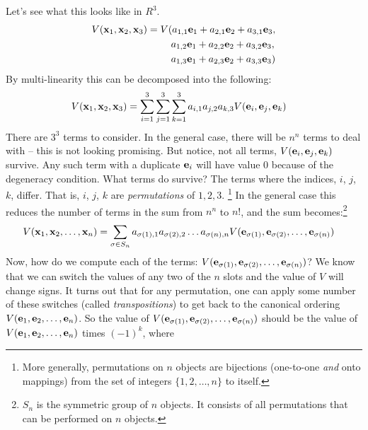 \documentclass{article}
\begin{document}
Let's see what this looks like in $R^3$.
\begin{align}
  V({\bf x}_1, {\bf x}_2, {\bf x}_3)
  &= V(a_{1,1} {\bf e}_1 + a_{2,1} {\bf e}_2 + a_{3,1} {\bf e}_3, \nonumber \\
  &\phantom{= V(\,}a_{1,2} {\bf e}_1 + a_{2,2} {\bf e}_2 + a_{3,2} {\bf e}_3, \nonumber \\
  &\phantom{= V(\,}a_{1,3} {\bf e}_1 + a_{2,3} {\bf e}_2 + a_{3,3} {\bf e}_3)
\end{align}
By multi-linearity this can be decomposed into the following:
\begin{align}
  V({\bf x}_1, {\bf x}_2, {\bf x}_3)
  &= \sum_{i=1}^3\sum_{j=1}^3 \sum_{k=1}^3 a_{i,1} a_{j,2} a_{k,3}
        V({\bf e}_{i}, {\bf e}_{j}, {\bf e}_{k})
\end{align}
There are $3^3$ terms to consider. In the general case, there will be $n^n$ terms to
deal with -- this is not looking promising. But notice, not all terms,
$V({\bf e}_{i}, {\bf e}_{j}, {\bf e}_{k})$ survive. Any such term with
a duplicate ${\bf e}_i$ will have value $0$ because of the degeneracy condition.
What terms do survive? The terms
where the indices, $i$, $j$, $k$, differ. That is, $i$, $j$, $k$ are
{\em permutations\/}
of $1, 2, 3$.%
\footnote{More generally, permutations on $n$ objects are bijections
  (one-to-one {\em and\/} onto mappings) from the set of integers
  $\{1, 2, \ldots, n\}$ to itself.}
In the general case this reduces
the number of terms in the sum from $n^n$ to $n!$, and the
sum becomes:\footnote{$S_n$ is the symmetric group of $n$ objects. It consists of 
all permutations that can be performed on $n$ objects.}
\begin{align}
  V({\bf x}_1, {\bf x}_2, \ldots, {\bf x}_n)
  &= \sum_{\sigma \in S_n} a_{\sigma(1), 1} a_{\sigma(2),2} \ldots a_{\sigma(n), n}
        V({\bf e}_{\sigma(1)}, {\bf e}_{\sigma(2)}, \ldots, {\bf e}_{\sigma(n)})
\end{align}
Now, how do we compute each of the terms:
$V({\bf e}_{\sigma(1)}, {\bf e}_{\sigma(2)}, \ldots, {\bf e}_{\sigma(n)})$?
We know that we can switch the values of any two of the $n$ slots and the
value of $V$ will change signs. It turns out that for any permutation, one can
apply some number of these switches (called {\em transpositions\/})
to get back to the canonical
ordering $V({\bf e}_1, {\bf e}_2, \ldots, {\bf e}_n)$. So the value of
$V({\bf e}_{\sigma(1)}, {\bf e}_{\sigma(2)}, \ldots, {\bf e}_{\sigma(n)})$ should be
the value of $V({\bf e}_1, {\bf e}_2, \ldots, {\bf e}_n)$ times $(-1)^k$, where
\end{document}
